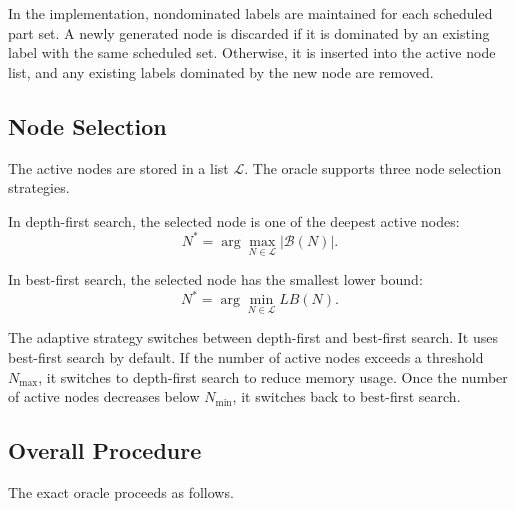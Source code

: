 \documentclass[letterpaper, 10 pt, conference]{ieeeconf}  %
\begin{document}
In the implementation, nondominated labels are maintained for each scheduled
part set. A newly generated node is discarded if it is dominated by an
existing label with the same scheduled set. Otherwise, it is inserted into
the active node list, and any existing labels dominated by the new node are
removed.

\subsection{Node Selection}

The active nodes are stored in a list $\mathcal{L}$. The oracle supports
three node selection strategies.

In depth-first search, the selected node is one of the deepest active nodes:
\begin{equation}
	N^*
	=
	\arg\max_{N\in\mathcal{L}}
	|\mathcal{B}(N)|.
\end{equation}

In best-first search, the selected node has the smallest lower bound:
\begin{equation}
	N^*
	=
	\arg\min_{N\in\mathcal{L}}
	LB(N).
\end{equation}

The adaptive strategy switches between depth-first and best-first search. It
uses best-first search by default. If the number of active nodes exceeds a
threshold $N_{\max}$, it switches to depth-first search to reduce memory
usage. Once the number of active nodes decreases below $N_{\min}$, it
switches back to best-first search.

\subsection{Overall Procedure}

The exact oracle proceeds as follows.
\end{document}

